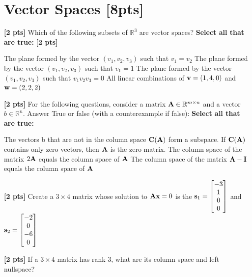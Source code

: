 \documentclass[11pt,addpoints,answers]{exam}
\numberwithin{equation}{section} %
\numberwithin{figure}{section} %
\numberwithin{table}{section} %
\begin{document}
\clearpage

\section{Vector Spaces  [8pts]}
\begin{questions}

\question \textbf{[2 pts]} Which of the following subsets of $\mathbb{R}^3$ are vector spaces?
    \textbf{Select all that are true:} \textbf{[2 pts]}
    \checkboxchar{$\Box$} \checkedchar{$\blacksquare$}
    \begin{checkboxes}
        \choice The plane formed by the vector $(v_1, v_2, v_3) $ such that $v_1 = v_2$
        \choice The plane formed by the vector $(v_1, v_2, v_3) $ such that $v_1 = 1$
        \choice The plane formed by the vector $(v_1, v_2, v_3) $  such that $v_1 v_2 v_3 = 0$
        \choice All linear combinations of $\mathbf{v} = (1, 4, 0)$ and $\mathbf{w} = (2, 2, 2)$
    \end{checkboxes}

\question \textbf{[2 pts]} For the following questions, consider a matrix $\mathbf{A} \in \mathbb{R}^{m \times n}$ and a vector $b \in \mathbb{R}^n$. Answer True or false (with a counterexample if false):
    \textbf{Select all that are true:} 
    \begin{checkboxes}
        \choice The vectors b that are not in the column space $\mathbf{C}(\mathbf{A})$ form a subspace.
        \choice If $\mathbf{C}(\mathbf{A})$ contains only zero vectors, then $\mathbf{A}$ is the zero matrix.
        \choice The column space of the matrix $2\mathbf{A}$ equals the column space of $\mathbf{A}$
        \choice The column space of the matrix $\mathbf{A} - \mathbf{I}$ equals the column space of $\mathbf{A}$
    \end{checkboxes}

\question \textbf{[2 pts]} Create a $3 \times 4$ matrix whose solution to $\mathbf{A} \mathbf{x} = 0$ is the $\mathbf{s}_1=\begin{bmatrix}
         -3 \\
         1 \\
         0 \\
         0
        \end{bmatrix}$ and $\mathbf{s}_2=\begin{bmatrix}
         -2 \\
         0 \\
         -6 \\
         0
        \end{bmatrix}$

    \begin{tcolorbox}[fit,height=5cm, width=\textwidth, blank, borderline={0.5pt}{-2pt},halign=center, valign=center, nobeforeafter]
    \end{tcolorbox}


\question \textbf{[2 pts]} If a $3{\times}4$ matrix has rank $3$, what are its column space and left nullspace?

    \begin{tcolorbox}[fit,height=3cm, width=\textwidth, blank, borderline={0.5pt}{-2pt},halign=center, valign=center, nobeforeafter]
    \end{tcolorbox}


\end{questions}
\clearpage
\end{document}
